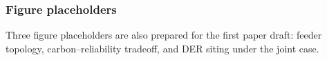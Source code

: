 



\subsubsection{Figure placeholders}

Three figure placeholders are also prepared for the first paper draft: feeder topology, carbon--reliability tradeoff, and DER siting under the joint case.





